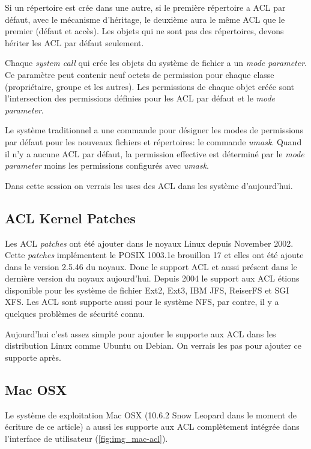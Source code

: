 Si un répertoire est crée dans une autre, si le première répertoire a ACL par défaut, avec le mécanisme d'héritage, le deuxième aura le même ACL que le premier (défaut  et accès). Les objets qui ne sont pas des répertoires, devons hériter les ACL par défaut seulement.
 
Chaque \emph{system call} qui crée les objets du système de fichier a un \emph{mode parameter}. Ce paramètre peut contenir neuf octets de permission pour chaque classe (propriétaire, groupe et les autres). Les permissions de chaque objet créée sont l'intersection des permissions définies pour les ACL par défaut et le \emph{mode parameter}.
 
Le système traditionnel a une commande pour désigner les modes de permissions par défaut pour les nouveaux fichiers et répertoires: le commande \emph{umask}. Quand il n'y a aucune ACL par défaut, la permission effective est déterminé par le \emph{mode parameter} moins les permissions configurés avec \emph{umask}.
 

Dans cette session on verrais les uses des ACL dans les système d'aujourd'hui. 

\subsection{ACL Kernel Patches}
Les ACL \emph{patches} ont été ajouter dans le noyaux Linux depuis November 2002. Cette \emph{patches} implémentent le POSIX 1003.1e brouillon 17 et elles ont été ajoute dans le version 2.5.46 du noyaux. Donc le support ACL et aussi présent dans le dernière version du noyaux aujourd'hui. Depuis 2004 le support aux ACL étions disponible pour les système de fichier Ext2, Ext3, IBM JFS, ReiserFS et SGI XFS. Les ACL sont supporte aussi pour le système NFS, par contre, il y a quelques problèmes de sécurité connu\cite{nfs_problem}. 

Aujourd'hui c'est assez simple pour ajouter le supporte aux ACL dans les distribution Linux comme Ubuntu ou Debian. On verrais les pas pour ajouter ce supporte après.

\subsection{Mac OSX}
Le système de exploitation Mac OSX (10.6.2 Snow Leopard dans le moment de écriture de ce article) a aussi les supporte aux ACL complètement intégrée dans l'interface de utilisateur (\ref{fig:img_mac-acl}). 

